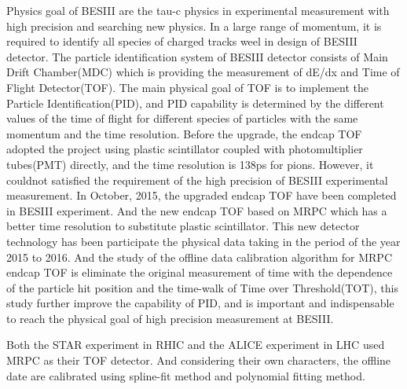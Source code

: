 \begin{englishabstract}
Physics goal of BESIII are the tau-c physics in experimental measurement with high precision and searching new physics.
In a large range of momentum, it is required to identify all species of charged tracks weel in design of BESIII detector.
The particle identification system of BESIII detector consists of Main Drift Chamber(MDC) which is providing the measurement of dE/dx and Time of Flight Detector(TOF).
The main physical goal of TOF is to implement the Particle Identification(PID), and PID capability is determined by the different values of the time of flight for different species of particles with the same momentum and the time resolution.
Before the upgrade, the endcap TOF adopted the project using plastic scintillator coupled with photomultiplier tubes(PMT) directly, and the time resolution is 138ps for pions. However, it couldnot satisfied the requirement of the high precision of BESIII experimental measurement. In October, 2015, the upgraded endcap TOF have been completed in BESIII experiment. And the new endcap TOF based on MRPC which has a better time resolution to substitute plastic scintillator. This new detector technology has been participate the physical data taking in the period of the year 2015 to 2016.
And the study of the offline data calibration algorithm for MRPC endcap TOF is eliminate the original measurement of time with the dependence of the particle hit position and the time-walk of Time over Threshold(TOT), this study further improve the capability of PID, and is important and indispensable to reach the physical goal of high precision measurement at BESIII. 

Both the STAR experiment in RHIC and the ALICE experiment in LHC used MRPC as their TOF detector. And considering their own characters, the offline date are calibrated using spline-fit method and polynomial fitting method.


\end{englishabstract}
